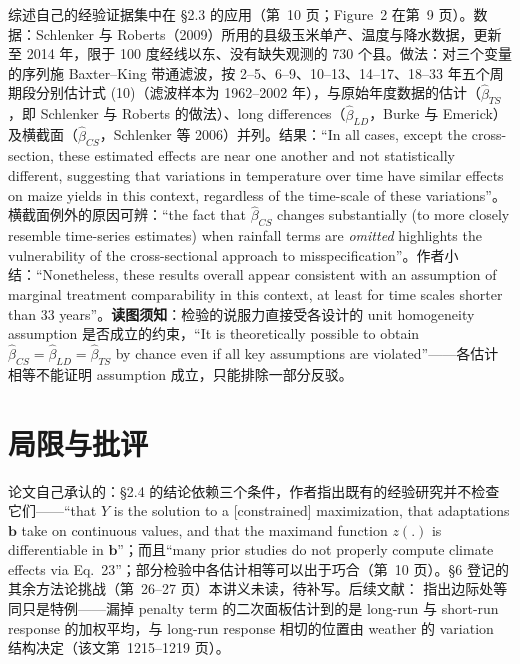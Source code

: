综述自己的经验证据集中在 \S 2.3 的应用（第~10 页；Figure~2 在第~9 页）。数据：Schlenker 与 Roberts（2009）所用的县级玉米单产、温度与降水数据，更新至 2014 年，限于 100 度经线以东、没有缺失观测的 730 个县。做法：对三个变量的序列施 Baxter--King 带通滤波，按 2--5、6--9、10--13、14--17、18--33 年五个周期段分别估计式 (10)（滤波样本为 1962--2002 年），与原始年度数据的估计（$\hat\beta_{TS}$，即 Schlenker 与 Roberts 的做法）、long differences（$\hat\beta_{LD}$，Burke 与 Emerick）及横截面（$\hat\beta_{CS}$，Schlenker 等 2006）并列。结果：``In all cases, except the cross-section, these estimated effects are near one another and not statistically different, suggesting that variations in temperature over time have similar effects on maize yields in this context, regardless of the time-scale of these variations''\citep[第~10 页]{hsiang2016climate}。横截面例外的原因可辨：``the fact that $\hat\beta_{CS}$ changes substantially (to more closely resemble time-series estimates) when rainfall terms are \emph{omitted} highlights the vulnerability of the cross-sectional approach to misspecification''\citep[第~10 页]{hsiang2016climate}。作者小结：``Nonetheless, these results overall appear consistent with an assumption of marginal treatment comparability in this context, at least for time scales shorter than 33 years''\citep[第~10 页]{hsiang2016climate}。\textbf{读图须知}：检验的说服力直接受各设计的 unit homogeneity assumption 是否成立的约束，``It is theoretically possible to obtain $\hat\beta_{CS}=\hat\beta_{LD}=\hat\beta_{TS}$ by chance even if all key assumptions are violated''\citep[第~10 页]{hsiang2016climate}——各估计相等不能证明 assumption 成立，只能排除一部分反驳。

\section{局限与批评}

论文自己承认的：\S 2.4 的结论依赖三个条件，作者指出既有的经验研究并不检查它们——``that $Y$ is the solution to a [constrained] maximization, that adaptations $\mathbf{b}$ take on continuous values, and that the maximand function $z(.)$ is differentiable in $\mathbf{b}$''\citep[第~14 页]{hsiang2016climate}；而且``many prior studies do not properly compute climate effects via Eq.~23''\citep[第~14 页，作者举 Schlenker et al. 2013 与 Houser et al. 2015 为突出的例外，并提到另有数项研究计算正确或以线性外推近似]{hsiang2016climate}；部分检验中各估计相等可以出于巧合（第~10 页）。\S 6 登记的其余方法论挑战（第~26--27 页）本讲义未读，待补写。后续文献： 指出边际处等同只是特例——漏掉 penalty term 的二次面板估计到的是 long-run 与 short-run response 的加权平均，与 long-run response 相切的位置由 weather 的 variation 结构决定（该文第~1215--1219 页）。

